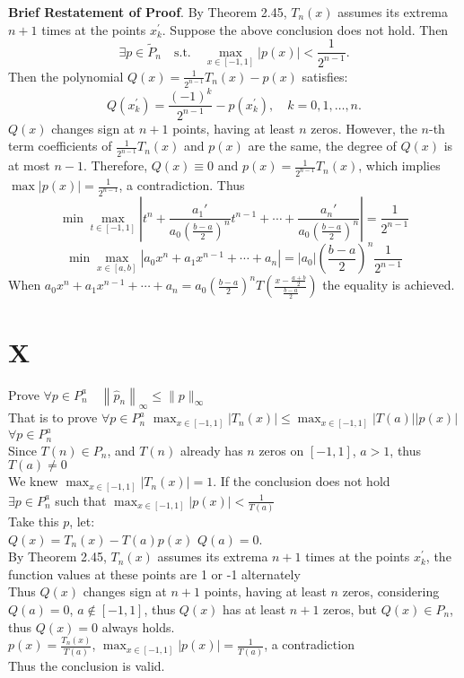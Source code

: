 \documentclass[a4paper]{article}
\begin{document}
\textbf{Brief Restatement of Proof}. By Theorem 2.45, \( T_{n}(x) \) assumes its extrema \( n+1 \) times at the points \( x_{k}^{\prime} \). Suppose the above conclusion does not hold. Then\\
\[
\exists p \in \tilde{P}_{n} \quad \text{s.t.} \quad \max_{x \in [-1,1]} \left| p(x) \right| < \frac{1}{2^{n-1}}.
\]
Then the polynomial \( Q(x) = \frac{1}{2^{n-1}} T_n(x) - p(x) \) satisfies:
\[
Q(x_{k}^{\prime}) = \frac{(-1)^{k}}{2^{n-1}} - p(x_{k}^{\prime}), \quad k = 0, 1, \ldots, n.
\]
\( Q(x) \) changes sign at \( n+1 \) points, having at least \( n \) zeros. However, the \( n \)-th term coefficients of \( \frac{1}{2^{n-1}} T_n(x) \) and \( p(x) \) are the same, the degree of \( Q(x) \) is at most \( n-1 \). Therefore, \( Q(x) \equiv 0 \) and \( p(x) = \frac{1}{2^{n-1}} T_{n}(x) \), which implies \( \max |p(x)| = \frac{1}{2^{n-1}} \), a contradiction.
Thus
\[
\min \max_{t \in [-1, 1]} \left| t^n + \frac{a_1'}{a_0 \left(\frac{b-a}{2}\right)^n} t^{n-1} + \cdots + \frac{a_n'}{a_0 \left(\frac{b-a}{2}\right)^n} \right| = \frac{1}{2^{n-1}}
\]
\[
\min \max_{x \in [a, b]} \left| a_0 x^n + a_1 x^{n-1} + \cdots + a_n \right| = \left| a_0 \right| \left(\frac{b-a}{2}\right)^n \frac{1}{2^{n-1}}
\]
When \( a_0 x^n + a_1 x^{n-1} + \cdots + a_n = a_0 \left(\frac{b-a}{2}\right)^n  T\left(\frac{x - \frac{a+b}{2}}{\frac{b-a}{2}}\right) \) the equality is achieved.

\section*{X}
Prove \( \forall p \in P_n^a \quad \left\| \hat{p}_n \right\|_{\infty} \leq \| p \|_{\infty} \)\\
That is to prove \( \forall p \in P_n^a \) \( \max_{x \in [-1,1]} \left| T_n(x) \right| \leq \max_{x \in [-1,1]} \left| T
(a) \right| \left| p(x) \right| \)
\( \forall p \in P_n^a \)\\
Since \( T(n) \in P_n \), and \( T(n) \) already has \( n \) zeros on \([-1,1]\), \( a > 1 \), thus \( T(a) \neq 0 \)\\
We knew $\max_{x \in [-1,1]} \left| T_n(x) \right|=1$. If the conclusion does not hold\\
\( \exists p \in P_n^a \) such that \( \max_{x \in [-1,1]} \left| p(x) \right| < \frac{1}{T(a)} \)\\
Take this \( p \), let:\\
\( Q(x) = T_n(x) - T(a) p(x) \) \( Q(a) = 0 \).\\
By Theorem 2.45, \( T_{n}(x) \) assumes its extrema \( n+1 \) times at the points \( x_{k}^{\prime} \), the function values at these points are 1 or -1 alternately\\
Thus \( Q(x) \) changes sign at \( n+1 \) points, having at least \( n \) zeros, considering \( Q(a) = 0 \), \( a \notin [-1,1] \), thus \( Q(x) \) has at least \( n+1 \) zeros, but \( Q(x) \in P_n \), thus \( Q(x) = 0 \) always holds.\\
\( p(x) = \frac{T_n(x)}{T(a)} \), \( \max_{x \in [-1,1]} \left| p(x) \right| = \frac{1}{T(a)} \), a contradiction\\
Thus the conclusion is valid.\\
\end{document}
